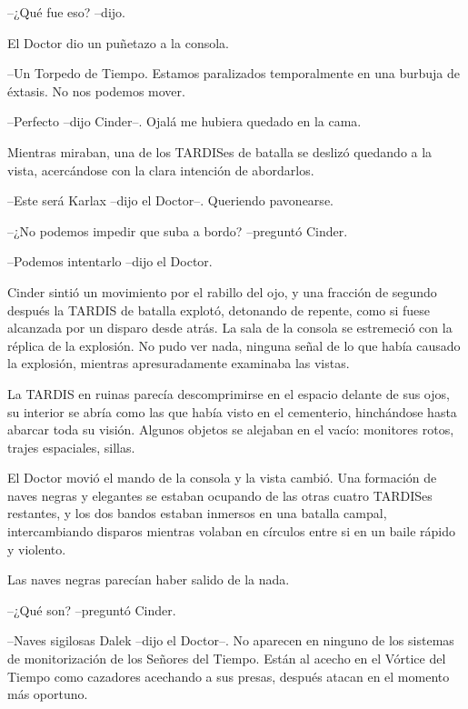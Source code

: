 --¿Qué fue eso? --dijo.



El Doctor dio un puñetazo a la consola. 



--Un Torpedo de Tiempo. Estamos paralizados temporalmente en una burbuja de éxtasis. No nos podemos mover.

--Perfecto --dijo Cinder--. Ojalá me hubiera quedado en la cama.



Mientras miraban, una de los TARDISes de batalla se deslizó quedando a la vista, acercándose con la clara intención de abordarlos. 



--Este será Karlax --dijo el Doctor--. Queriendo pavonearse.

--¿No podemos impedir que suba a bordo? --preguntó Cinder.

--Podemos intentarlo --dijo el Doctor.



Cinder sintió un movimiento por el rabillo del ojo, y una fracción de segundo después la TARDIS de batalla explotó, detonando de repente, como si fuese alcanzada por un disparo desde atrás. La sala de la consola se estremeció con la réplica de la explosión. No pudo ver nada, ninguna señal de lo que había causado la explosión, mientras apresuradamente examinaba las vistas.

La TARDIS en ruinas parecía descomprimirse en el espacio delante de sus ojos, su interior se abría como las que había visto en el cementerio, hinchándose hasta abarcar toda su visión. Algunos objetos se alejaban en el vacío: monitores rotos, trajes espaciales, sillas.

El Doctor movió el mando de la consola y la vista cambió. Una formación de naves negras y elegantes se estaban ocupando de las otras cuatro TARDISes restantes, y los dos bandos estaban inmersos en una batalla campal, intercambiando disparos mientras volaban en círculos entre si en un baile rápido y violento.

Las naves negras parecían haber salido de la nada. 



--¿Qué son? --preguntó Cinder.

--Naves sigilosas Dalek --dijo el Doctor--. No aparecen en ninguno de los sistemas de monitorización de los Señores del Tiempo. Están al acecho en el Vórtice del Tiempo como cazadores acechando a sus presas, después atacan en el momento más oportuno.



